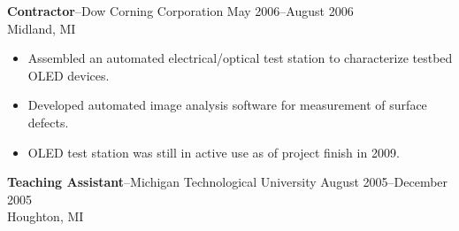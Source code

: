\documentclass[10pt]{article}
\newcommand{\jobitem}[4]{
    \vspace{4pt}

    \textbf{#1}--#2 \hfill #3\\ #4

    \vspace{-8pt}
}
\begin{document}

\jobitem{Contractor}{Dow Corning Corporation}{May 2006--August 2006}{Midland, MI}

\begin{itemize}\setlength{\itemsep}{0cm}
  \setlength{\parskip}{0cm}
\item Assembled an automated electrical/optical test station to characterize testbed OLED devices. 
\item Developed automated image analysis software for measurement of surface defects.
\item OLED test station was still in active use as of project finish in 2009.
\end{itemize}
%
\vspace{16pt}
\jobitem{Teaching Assistant}{Michigan Technological University}{August 2005--December 2005}{Houghton, MI}
\end{document}
